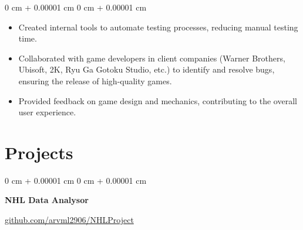 \documentclass[10pt, letterpaper]{article}
\newenvironment{highlights}{
    \begin{itemize}[
        topsep=0.10 cm,
        parsep=0.10 cm,
        partopsep=0pt,
        itemsep=0pt,
        leftmargin=0 cm + 10pt
    ]
}{
    \end{itemize}
} %
\newenvironment{onecolentry}{
    \begin{adjustwidth}{
        0 cm + 0.00001 cm
    }{
        0 cm + 0.00001 cm
    }
}{
    \end{adjustwidth}
} %
\newenvironment{twocolentry}[2][]{
    \onecolentry
    \def\secondColumn{#2}
    \setcolumnwidth{\fill, 6.5 cm}
    \begin{paracol}{2}
}{
    \switchcolumn \raggedleft \secondColumn
    \end{paracol}
    \endonecolentry
} %
\begin{document}
        \vspace{0.10 cm}
        \begin{onecolentry}
            \begin{highlights}
                \item Created internal tools to automate testing processes, reducing manual testing time.
                \item Collaborated with game developers in client companies (Warner Brothers, Ubisoft, 2K, Ryu Ga Gotoku Studio, etc.) to identify and resolve bugs, ensuring the release of high-quality games.
                \item Provided feedback on game design and mechanics, contributing to the overall user experience.
            \end{highlights}
        \end{onecolentry}



            

    \section{Projects}
        \begin{twocolentry}{
            \href{https://github.com/arvml2906/NHLProject}{github.com/arvml2906/NHLProject}
        }
            \textbf{NHL Data Analysor}
        \end{twocolentry}
\end{document}
